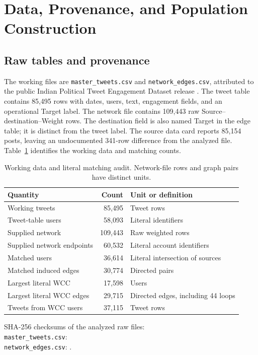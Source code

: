 \documentclass[11pt,a4paper]{article}
\begin{document}
\section{Data, Provenance, and Population Construction}
\subsection{Raw tables and provenance}
The working files are \texttt{master\_tweets.csv} and \texttt{network\_edges.csv}, attributed to the public Indian Political Tweet Engagement Dataset release \citep{kaggleipte}. The tweet table contains 85,495 rows with dates, users, text, engagement fields, and an operational Target label. The network file contains 109,443 raw Source--destination--Weight rows. The destination field is also named Target in the edge table; it is distinct from the tweet label. The source data card reports 85,154 posts, leaving an undocumented 341-row difference from the analyzed file. Table~\ref{tab:dataaudit} identifies the working data and matching counts.

\begin{table}[htbp]\centering\small
\caption{Working data and literal matching audit. Network-file rows and graph pairs have distinct units.}\label{tab:dataaudit}
\begin{tabularx}{\textwidth}{@{}XrX@{}}\toprule Quantity & Count & Unit or definition\\\midrule
Working tweets & 85,495 & Tweet rows\\
Tweet-table users & 58,093 & Literal identifiers\\
Supplied network & 109,443 & Raw weighted rows\\
Supplied network endpoints & 60,532 & Literal account identifiers\\
Matched users & 36,614 & Literal intersection of sources\\
Matched induced edges & 30,774 & Directed pairs\\
Largest literal WCC & 17,598 & Users\\
Largest literal WCC edges & 29,715 & Directed edges, including 44 loops\\
Tweets from WCC users & 37,115 & Tweet rows\\
\bottomrule\end{tabularx}
\vspace{2mm}\begin{minipage}{\textwidth}\footnotesize
SHA-256 checksums of the analyzed raw files:\\
\texttt{master\_tweets.csv}: \\
\texttt{network\_edges.csv}: .
\end{minipage}\end{table}
\end{document}
